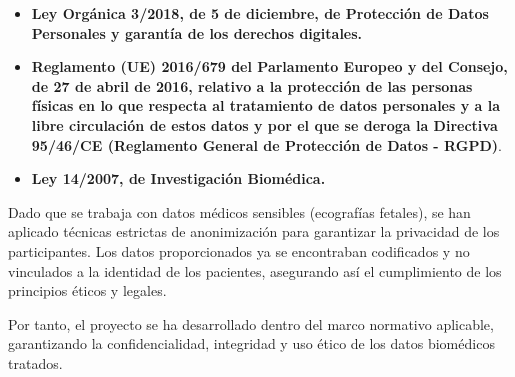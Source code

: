 \begin{itemize}
    \item \textbf{Ley Orgánica 3/2018, de 5 de diciembre, de Protección de Datos Personales y garantía de los derechos digitales.}
    \item \textbf{Reglamento (UE) 2016/679 del Parlamento Europeo y del Consejo, de 27 de abril de 2016, relativo a la protección de las personas físicas en lo que respecta al tratamiento de datos personales y a la libre circulación de estos datos y por el que se deroga la Directiva 95/46/CE (Reglamento General de Protección de Datos - RGPD)}.
    \item \textbf{Ley 14/2007, de Investigación Biomédica.}
\end{itemize}
Dado que se trabaja con datos médicos sensibles (ecografías fetales), se han aplicado técnicas estrictas de anonimización para garantizar la privacidad de los participantes. Los datos proporcionados ya se encontraban codificados y no vinculados a la identidad de los pacientes, asegurando así el cumplimiento de los principios éticos y legales.


Por tanto, el proyecto se ha desarrollado dentro del marco normativo aplicable, garantizando la confidencialidad, integridad y uso ético de los datos biomédicos tratados.

